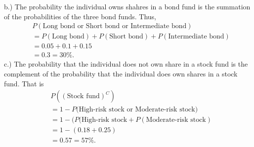 \documentclass{report}
\begin{document}
    b.) The probability the individual owns shahres in a bond fund is the summation of the probabilities  of the three bond funds. Thus,
    \begin{align*}
        &P(\text{Long bond or Short bond or Intermediate bond})  \\
        &= P(\text{Long bond}) + P(\text{Short bond}) + P(\text{Intermediate bond}) \\
        &=0.05 + 0.1 + 0.15 \\
        &=0.3 = 30\%
    .\end{align*}
    \pagebreak \bigbreak \noindent 
    c.) The probability that the individual does not own share in a stock fund is the complement of the probability that the individual does own shares in a stock fund. That is 
    \begin{align*}
        &P((\text{Stock fund})^{C})  \\
        &= 1-P(\text{High-risk stock or Moderate-risk stock)} \\
        &=1 - (P(\text{High-risk stock} + P(\text{Moderate-risk stock})  \\
        &= 1- (0.18 + 0.25) \\
        &=0.57 = 57\%
    .\end{align*}
\end{document}
